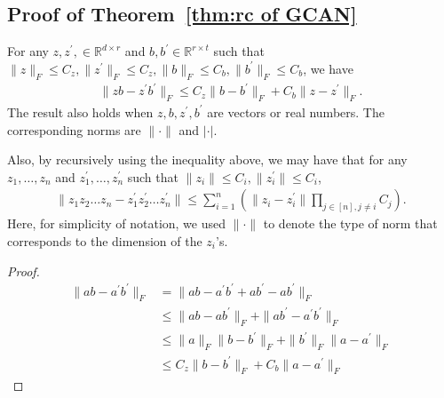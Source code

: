 \subsection{Proof of Theorem~\ref{thm:rc of GCAN}}\label{appendix:GCAN}
\begin{lemma}\label{lem:inequalities}
    For any $z, z^\prime, \in \mathbb{R}^{d \times r}$ and $b, b^\prime \in \mathbb{R}^{r \times t}$ such that $\|z\|_F \leq C_z, \|z^\prime \|_F\leq C_z, \|b\|_F\leq C_b, \|b^\prime\|_F \leq C_b$, we have 
    \begin{align*}
        \|zb - z^\prime b^\prime\|_F 
        \leq C_z\|b-b^\prime\|_F + C_b\|z-z^\prime \|_F.
    \end{align*}
    The result also holds when $z, b, z^\prime, b^\prime$ are vectors or real numbers. The corresponding norms are $\|\cdot \|$ and $|\cdot |$.

    Also, by recursively using the inequality above, we may have that for any $z_1, \ldots, z_n$ and $z_1^\prime, \ldots, z_n^\prime$ such that $\|z_i \|\leq C_i, \|z_i^\prime \|\leq C_i$,
    \begin{align*}
        \|z_1 z_2 \ldots z_n - z_1^\prime z_2^\prime \ldots z_n^\prime\| \leq \sum_{i=1}^n \left(\|z_i - z_i^\prime\| \prod_{j\in [n], j \neq i} C_j\right).
    \end{align*}
    Here, for simplicity of notation, we used $\|\cdot \|$ to denote the type of norm that corresponds to the dimension of the $z_i$'s.
\end{lemma}
\begin{proof}
    \begin{align*}
        \|ab - a^\prime b^\prime\|_F 
        &= \|ab - a^\prime b^\prime + ab^\prime - ab^\prime\|_F\\
        &\leq \|ab - ab^\prime\|_F + \|ab^\prime - a^\prime b^\prime\|_F \tag{by triangle inequality}\\
        &\leq \|a\|_F\|b-b^\prime\|_F + \|b^\prime\|_F\|a-a^\prime \|_F \tag{by Cauchy-Schwarz inequality}\\
        &\leq C_z\|b-b^\prime\|_F + C_b\|a-a^\prime \|_F
    \end{align*}
\end{proof}

